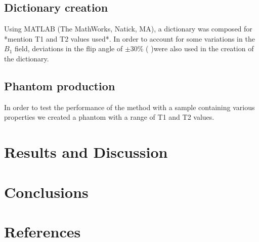 \documentclass[3p, twocolumn]{elsarticle}
\begin{document}
\subsection{Dictionary creation}
Using MATLAB (The
MathWorks, Natick, MA), a dictionary was composed for *mention T1 and T2 values used*. In order to account for some variations in the $B_1$ field,  deviations in the flip angle of $\pm$30\% (%
)were also used in the creation of the dictionary.

\subsection{Phantom production}
In order to test the performance of the method with a sample containing various properties we created a phantom with a range of T1 and T2 values. %

\section{Results and Discussion}

\section{Conclusions}

\section*{References}


\end{document}
